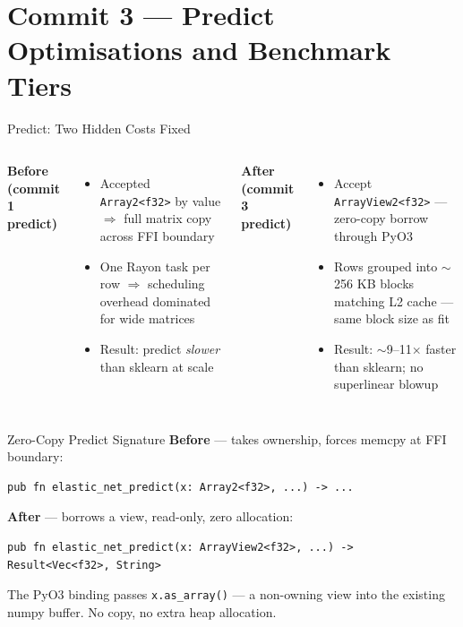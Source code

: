 \documentclass[aspectratio=169]{beamer}
\begin{document}
\section{Commit 3 — Predict Optimisations and Benchmark Tiers}

\begin{frame}{Predict: Two Hidden Costs Fixed}
  \begin{columns}
    \textbf{Before (commit 1 predict)}
    \begin{itemize}
      \item Accepted \texttt{Array2<f32>} by value $\Rightarrow$ full matrix copy across FFI boundary
      \item One Rayon task per row $\Rightarrow$ scheduling overhead dominated for wide matrices
      \item Result: predict \emph{slower} than sklearn at scale
    \end{itemize}
    \textbf{After (commit 3 predict)}
    \begin{itemize}
      \item Accept \texttt{ArrayView2<f32>} — zero-copy borrow through PyO3
      \item Rows grouped into $\sim$256 KB blocks matching L2 cache — same block size as fit
      \item Result: $\sim$9--11$\times$ faster than sklearn; no superlinear blowup
    \end{itemize}
  \end{columns}
\end{frame}

\begin{frame}[fragile]{Zero-Copy Predict Signature}
  \textbf{Before} — takes ownership, forces memcpy at FFI boundary:
\begin{lstlisting}
pub fn elastic_net_predict(x: Array2<f32>, ...) -> ...
\end{lstlisting}

  \textbf{After} — borrows a view, read-only, zero allocation:
\begin{lstlisting}
pub fn elastic_net_predict(x: ArrayView2<f32>, ...) -> Result<Vec<f32>, String>
\end{lstlisting}
  \vspace{0.4em}
  The PyO3 binding passes \texttt{x.as\_array()} — a non-owning view into the
  existing numpy buffer.  No copy, no extra heap allocation.
\end{frame}
\end{document}
